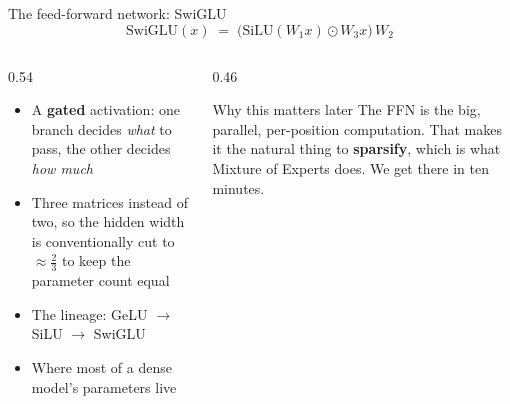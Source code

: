 \documentclass[aspectratio=169,10pt]{beamer}
\begin{document}
\begin{frame}{The feed-forward network: SwiGLU}
  \[
    \mathrm{SwiGLU}(x) \;=\; \big(\mathrm{SiLU}(W_1 x) \odot W_3 x\big)\,W_2
  \]
  \begin{columns}[T]
    \begin{column}{0.54\textwidth}
      \begin{itemize}
        \item A \textbf{gated} activation: one branch decides \emph{what} to
          pass, the other decides \emph{how much}
        \item Three matrices instead of two, so the hidden width is conventionally
          cut to $\approx \tfrac{2}{3}$ to keep the parameter count equal
        \item The lineage: GeLU $\to$ SiLU $\to$ SwiGLU
        \item Where most of a dense model's parameters live
      \end{itemize}
    \end{column}
    \begin{column}{0.46\textwidth}
      \begin{block}{Why this matters later}
        \small
        The FFN is the big, parallel, per-position computation.
        \vspace{0.3em}
        That makes it the natural thing to \textbf{sparsify}, which is what
        Mixture of Experts does. We get there in ten minutes.
      \end{block}
    \end{column}
  \end{columns}
\end{frame}
\end{document}
